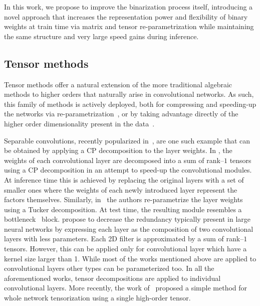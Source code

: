 \documentclass[10pt,twocolumn,letterpaper]{article}
\begin{document}
In this work, we propose to improve the binarization process itself, introducing a novel approach that increases the representation power and flexibility of binary weights at train time via matrix and tensor re-parametrization while maintaining the same structure and very large speed gains during inference.

\subsection{Tensor methods}\label{ssec:tensor-methods}
Tensor methods offer a natural extension of the more traditional algebraic methods to higher orders that naturally arise in convolutional networks. As such, this family of methods is actively deployed, both for compressing and speeding-up the networks via re-parametrization~\cite{lebedev2014speeding,yong2015compression,astrid2017cp,yong2015compression}, or by taking advantage directly of the higher order dimensionality present in the data~\cite{kossaifi_tcl,kossaifi2018tensor}.



Separable convolutions, recently popularized in~\cite{chollet2017xception}, are one such example that can be obtained by applying a CP decomposition to the layer weights. In \cite{lebedev2014speeding}, the weights of each convolutional layer are decomposed into a sum of rank--\(1\) tensors using a CP decomposition in an attempt to speed-up the convolutional modules. At inference time this is achieved by replacing the original layers with a set of smaller ones where the weights of each newly introduced layer represent the factors themselves.
Similarly, in~\cite{yong2015compression} the authors re-parametrize the layer weights using a Tucker decomposition. At test time, the resulting module resembles a bottleneck~\cite{he2016deep} block. \cite{tai2015convolutional} propose to decrease the redundancy typically present in large neural networks by  expressing each layer as the composition of two convolutional layers with less parameters. Each 2D filter is approximated by a sum of rank--\(1\) tensors. However, this can be applied only for convolutional layer which have a kernel size larger than 1. While most of the works mentioned above are applied to convolutional layers other types can be parameterized too. In all the aforementioned works, tensor decompositions are applied to individual convolutional layers. More recently, the work of~\cite{kossaifi2018parametrizing} proposed a simple method for whole network tensorization using a single high-order tensor. 
\end{document}
